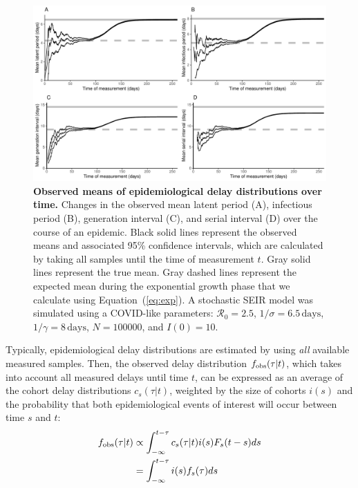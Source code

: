 \documentclass[12pt]{article}
\newcommand{\eref}[1]{(\ref{eq:#1})}
\begin{document}
\begin{figure}[!th]
\includegraphics[width=\textwidth]{figure_seir.pdf}
\caption{
\textbf{Observed means of epidemiological delay distributions over time.}
Changes in the observed mean latent period (A), infectious period (B), generation interval (C), and serial interval (D) over the course of an epidemic.
Black solid lines represent the observed means and associated 95\% confidence intervals, which are calculated by taking all samples until the time of measurement $t$.
Gray solid lines represent the true mean.
Gray dashed lines represent the expected mean during the exponential growth phase that we calculate using Equation~\eref{exp}.
A stochastic SEIR model was simulated using a COVID-like parameters: $\mathcal R_0 = 2.5$, $1/\sigma = 6.5\,\textrm{days}$, $1/\gamma = 8\,\textrm{days}$, $N=100000$, and $I(0)=10$.
}
\label{fig:seir}
\end{figure}

Typically, epidemiological delay distributions are estimated by using \emph{all} available measured samples.
Then, the observed delay distribution $f_{\tiny\textrm{obs}}(\tau|t)$, which takes into account all measured delays until time $t$, can be expressed as an average of the cohort delay distributions $c_s(\tau|t)$, weighted by the size of cohorts $i(s)$ and the probability that both epidemiological events of interest will occur between time $s$ and $t$:
\begin{equation}
\begin{aligned}
f_{\tiny\textrm{obs}}(\tau|t) &\propto \int_{-\infty}^{t-\tau} c_s(\tau|t) i(s) F_s(t-s) ds\\
&= \int_{-\infty}^{t-\tau} i(s) f_s(\tau) ds
\end{aligned}
\end{equation}
\end{document}
